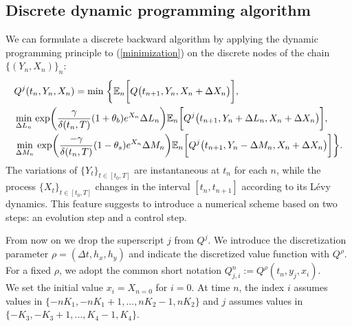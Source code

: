 \subsection{Discrete dynamic programming algorithm}\label{algorithm_Sect}
We can formulate a discrete backward algorithm by applying the dynamic programming principle to (\ref{minimization}) 
on the discrete nodes of the chain $\{( Y_n,X_n )\}_n$:
\begin{align}\label{HJB3}
 & Q^{j}(t_n,Y_n,X_n) = \min  
 \; \biggl\{ \mathbb{E}_n \biggl[ Q \bigl( t_{n+1}, Y_n, X_n + \Delta X_n \bigr) \biggr], \\ \nonumber
 & \min_{\Delta L_n} \, \exp \biggl(\frac{\gamma}{\delta(t_n,T)} (1+\theta_b) e^{X_n} \Delta L_n \biggr) 
  \mathbb{E}_n \biggl[ Q^{j} \bigl( t_{n+1}, Y_n+\Delta L_n, X_n + \Delta X_n \bigr) \biggr], \\ \nonumber
 & \min_{\Delta M_n} \, \exp \biggl(\frac{-\gamma}{\delta(t_n,T)} (1-\theta_s) e^{X_n} \Delta M_n \biggr)
  \mathbb{E}_n \biggl[ Q^{j} \bigl( t_{n+1}, Y_n-\Delta M_n, X_n + \Delta X_n \bigr) \biggr]
 \biggr\}.
\end{align}
The variations of $\{Y_t\}_{t \in [t_0,T]}$ are instantaneous at $t_n$ for each $n$, 
while the process $\{X_t\}_{t \in [t_0,T]}$ changes in the interval $[t_n,t_{n+1}]$ according to its Lévy dynamics.
This feature suggests to introduce a numerical scheme based on two steps: an evolution step and a control step.

From now on we drop the superscript $j$ from $Q^j$. We introduce the discretization parameter $\rho = (\Delta t, h_x, h_y)$ and indicate the discretized value function with 
$Q^{\rho}$. For a fixed $\rho$, we adopt the common short notation $Q^n_{j,i} := Q^{\rho}(t_n,y_j,x_i)$. \\
We set the initial value $x_i = X_{n=0}$ for $i=0$. At time $n$, the index $i$ assumes values in 
$\{ -n K_1,-n K_1+1,...,n K_2-1, n K_2 \}$ and $j$ assumes values in $\{ -K_3, -K_3+1,..., K_4-1, K_4 \}$.   

